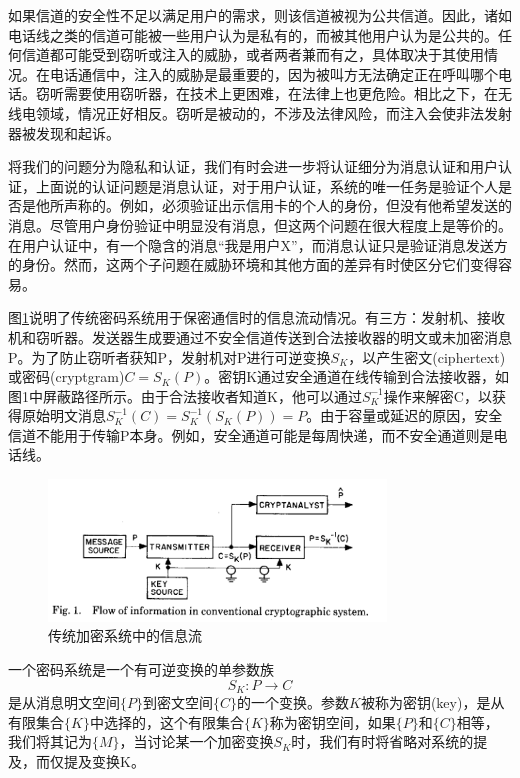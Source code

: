 \documentclass[]{article}
\begin{document}
	
	如果信道的安全性不足以满足用户的需求，则该信道被视为公共信道。因此，诸如电话线之类的信道可能被一些用户认为是私有的，而被其他用户认为是公共的。任何信道都可能受到窃听或注入的威胁，或者两者兼而有之，具体取决于其使用情况。在电话通信中，注入的威胁是最重要的，因为被叫方无法确定正在呼叫哪个电话。窃听需要使用窃听器，在技术上更困难，在法律上也更危险。相比之下，在无线电领域，情况正好相反。窃听是被动的，不涉及法律风险，而注入会使非法发射器被发现和起诉。
	
	
	将我们的问题分为隐私和认证，我们有时会进一步将认证细分为消息认证和用户认证，上面说的认证问题是消息认证，对于用户认证，系统的唯一任务是验证个人是否是他所声称的。例如，必须验证出示信用卡的个人的身份，但没有他希望发送的消息。尽管用户身份验证中明显没有消息，但这两个问题在很大程度上是等价的。在用户认证中，有一个隐含的消息“我是用户X”，而消息认证只是验证消息发送方的身份。然而，这两个子问题在威胁环境和其他方面的差异有时使区分它们变得容易。
	
	图\ref{Fig:fig1}说明了传统密码系统用于保密通信时的信息流动情况。有三方：发射机、接收机和窃听器。发送器生成要通过不安全信道传送到合法接收器的明文或未加密消息P。为了防止窃听者获知P，发射机对P进行可逆变换$S_K$，以产生密文(ciphertext)或密码(cryptgram)$C=S_K(P)$。密钥K通过安全通道在线传输到合法接收器，如图1中屏蔽路径所示。由于合法接收者知道K，他可以通过$S_K^{-1}$操作来解密C，以获得原始明文消息$S_K^{-1}(C)=S_K^{-1}(S_K(P))=P$。由于容量或延迟的原因，安全信道不能用于传输P本身。例如，安全通道可能是每周快递，而不安全通道则是电话线。
	
	\begin{figure}[htbp]
		\centering
		\includegraphics[width=0.8\textwidth]{FIG1.png}
		\caption{传统加密系统中的信息流}
		\label{Fig:fig1}
	\end{figure}
	
	一个密码系统是一个有可逆变换的单参数族
	\begin{equation}
		S_K:{P}\rightarrow {C}
	\end{equation}
	是从消息明文空间$\{P\}$到密文空间$\{C\}$的一个变换。参数$K$被称为密钥(key)，是从有限集合$\{K\}$中选择的，这个有限集合$\{K\}$称为密钥空间，如果$\{P\}$和$\{C\}$相等，我们将其记为$\{M\}$，当讨论某一个加密变换$S_K$时，我们有时将省略对系统的提及，而仅提及变换K。
	
\end{document}

